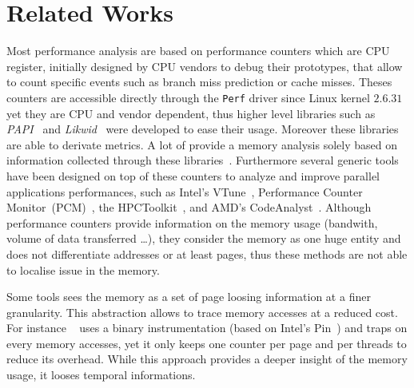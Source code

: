 
\section{Related Works}
\label{sec:related}

Most performance analysis are based on performance counters which are CPU
register, initially designed by CPU vendors to debug their prototypes, that
allow to count specific events such as branch miss prediction or cache misses.
Theses counters are accessible directly  through the \texttt{Perf} driver
since Linux kernel $2.6.31$ yet they are CPU and vendor dependent, thus higher
level libraries such as \emph{PAPI}~\cite{Weaver13PAPI} and
\emph{Likwid}~\cite{Treibig10LIKWID} were developed to ease their usage.
Moreover these libraries are able to derivate metrics. A lot of provide a
memory analysis solely based on information collected through these
libraries~\cite{Majo13(Mis)understanding,
Jiang14Understanding,Bosch00Rivet,Weyers14Visualization,Tao01Visualizing,DeRose01Hardware}.
%
Furthermore several generic tools have been designed on top of these counters
to analyze and improve parallel applications performances, such as Intel's
VTune~\cite{Reinders05VTune}, Performance Counter
Monitor~(PCM)~\cite{Intel2012b}, the HPCToolkit~\cite{Adhianto10HPCTOOLKIT},
and AMD's CodeAnalyst~\cite{Drongowski2008}.
%
Although performance counters provide information on the memory usage
(bandwith, volume of data transferred \ldots),  they consider the memory as
one huge entity and does not differentiate addresses or at least
pages, thus these methods are not able to localise issue in the memory.

Some tools sees the memory as a set of page loosing information at a finer
granularity. This abstraction allows to trace memory accesses at a reduced
cost. For instance \TABARNAC~\cite{Beniamine15TABARNAC} uses a binary
instrumentation (based on Intel's Pin~\cite{Luk05Pin}) and traps on every
memory accesses, yet it only keeps one counter per page and per threads to
reduce its overhead. While this approach provides a deeper insight of the
memory usage, it looses temporal informations.

